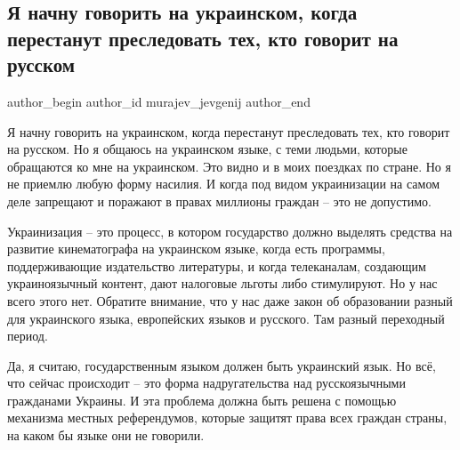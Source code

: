  
 
 
 
 
 
\subsection{Я начну говорить на украинском, когда перестанут преследовать тех, кто говорит на русском}
\label{sec:05_10_2021.fb.murajev_jevgenij.1.ukrainizacia}
 
\ifcmt
 author_begin
   author_id murajev_jevgenij
 author_end
\fi

Я начну говорить на украинском, когда перестанут преследовать тех, кто говорит
на русском. Но я общаюсь на украинском языке, с теми людьми, которые обращаются
ко мне на украинском. Это видно и в моих поездках по стране. Но я не приемлю
любую форму насилия. И когда под видом украинизации на самом деле запрещают и
поражают в правах миллионы граждан – это не допустимо.

Украинизация – это процесс, в котором государство должно выделять средства на
развитие кинематографа на украинском языке, когда есть программы,
поддерживающие издательство литературы, и когда телеканалам, создающим
украиноязычный контент, дают налоговые льготы либо стимулируют. Но у нас всего
этого нет. Обратите внимание, что у нас даже закон об образовании разный для
украинского языка, европейских языков и русского. Там разный переходный период.

Да, я считаю, государственным языком должен быть украинский язык. Но всё, что
сейчас происходит – это форма надругательства над русскоязычными гражданами
Украины. И эта проблема должна быть решена с помощью механизма местных
референдумов, которые защитят права всех граждан страны, на каком бы языке они
не говорили.

